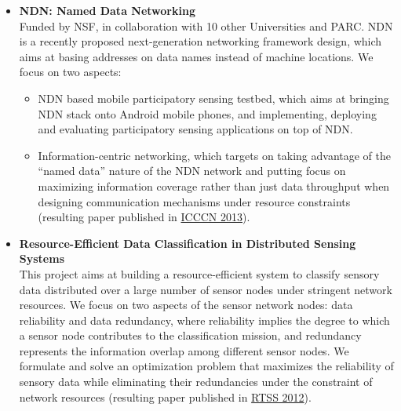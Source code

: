 \begin{itemize}
	\item \textbf{NDN: Named Data Networking} \\
	Funded by NSF, in collaboration with 10 other Universities and PARC. NDN is a recently proposed next-generation networking framework design, which aims at basing addresses on data names instead of machine locations. We focus on two aspects: 
	\begin{itemize}
		\item NDN based mobile participatory sensing testbed, which aims at bringing NDN stack onto Android mobile phones, and implementing, deploying and evaluating participatory sensing applications on top of NDN. 
		\item Information-centric networking, which targets on taking advantage of the ``named data'' nature of the NDN network and putting focus on maximizing information coverage rather than just data throughput when designing communication mechanisms under resource constraints (resulting paper published in \hyperlink{wang2013icccn}{\textsc{ICCCN 2013}}).
	\end{itemize}
	
	\item \textbf{Resource-Efficient Data Classification in Distributed Sensing Systems} \\
	This project aims at building a resource-efficient system to classify sensory data distributed over a large number of sensor nodes under stringent network resources. We focus on two aspects of the sensor network nodes: data reliability and data redundancy, where reliability implies the degree to which a sensor node contributes to the classification mission, and redundancy represents the information overlap among different sensor nodes. We formulate and solve an optimization problem that maximizes the reliability of sensory data while eliminating their redundancies under the constraint of network resources (resulting paper published in \hyperlink{su2012rtss}{\textsc{RTSS 2012}}).
\end{itemize}

